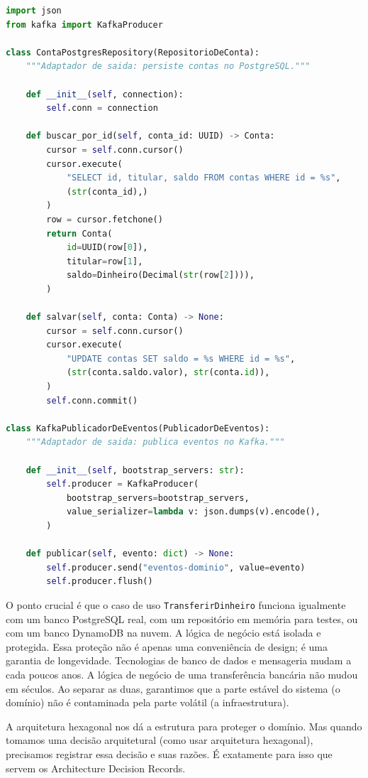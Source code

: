 \begin{lstlisting}[language=Python, caption={Adaptadores -- Implementações Concretas}]
import json
from kafka import KafkaProducer

class ContaPostgresRepository(RepositorioDeConta):
    """Adaptador de saida: persiste contas no PostgreSQL."""

    def __init__(self, connection):
        self.conn = connection

    def buscar_por_id(self, conta_id: UUID) -> Conta:
        cursor = self.conn.cursor()
        cursor.execute(
            "SELECT id, titular, saldo FROM contas WHERE id = %s",
            (str(conta_id),)
        )
        row = cursor.fetchone()
        return Conta(
            id=UUID(row[0]),
            titular=row[1],
            saldo=Dinheiro(Decimal(str(row[2]))),
        )

    def salvar(self, conta: Conta) -> None:
        cursor = self.conn.cursor()
        cursor.execute(
            "UPDATE contas SET saldo = %s WHERE id = %s",
            (str(conta.saldo.valor), str(conta.id)),
        )
        self.conn.commit()

class KafkaPublicadorDeEventos(PublicadorDeEventos):
    """Adaptador de saida: publica eventos no Kafka."""

    def __init__(self, bootstrap_servers: str):
        self.producer = KafkaProducer(
            bootstrap_servers=bootstrap_servers,
            value_serializer=lambda v: json.dumps(v).encode(),
        )

    def publicar(self, evento: dict) -> None:
        self.producer.send("eventos-dominio", value=evento)
        self.producer.flush()
\end{lstlisting}

O ponto crucial é que o caso de uso \texttt{TransferirDinheiro} funciona
igualmente com um banco PostgreSQL real, com um repositório em memória para
testes, ou com um banco DynamoDB na nuvem. A lógica de negócio está isolada
e protegida. Essa proteção não é apenas uma conveniência de design; é uma
garantia de longevidade. Tecnologias de banco de dados e mensageria mudam
a cada poucos anos. A lógica de negócio de uma transferência bancária não
mudou em séculos. Ao separar as duas, garantimos que a parte estável do
sistema (o domínio) não é contaminada pela parte volátil (a infraestrutura).

A arquitetura hexagonal nos dá a estrutura para proteger o domínio. Mas
quando tomamos uma decisão arquitetural (como usar arquitetura hexagonal),
precisamos registrar essa decisão e suas razões. É exatamente para isso
que servem os Architecture Decision Records.


